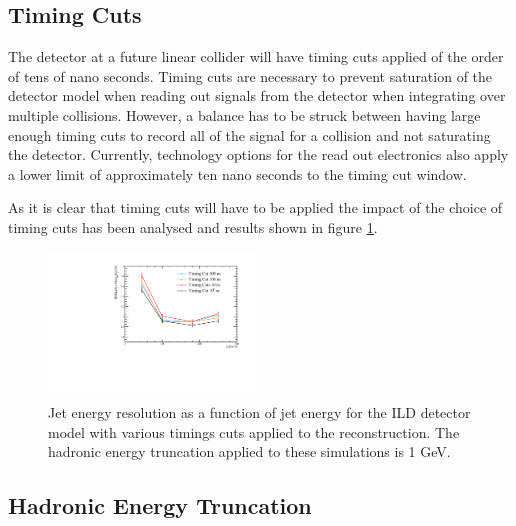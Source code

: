 \documentclass[final,3p,times,twocolumn]{elsarticle}
\begin{document}
\subsection{Timing Cuts}

The detector at a future linear collider will have timing cuts applied of the order of tens of nano seconds.  Timing cuts are necessary to prevent saturation of the detector model when reading out signals from the detector when integrating over multiple collisions.  However, a balance has to be struck between having large enough timing cuts to record all of the signal for a collision and not saturating the detector.  Currently, technology options for the read out electronics also apply a lower limit of approximately ten nano seconds to the timing cut window.

As it is clear that timing cuts will have to be applied the impact of the choice of timing cuts has been analysed and results shown in figure \ref{4-TC}.

\begin{figure}[!h]
  \begin{center}
     \includegraphics[width=0.49\textwidth]{4_BasicDetPerf/TimingCut.pdf}
     \caption{Jet energy resolution as a function of jet energy for the ILD detector model with various timings cuts applied to the reconstruction.  The hadronic energy truncation applied to these simulations is 1 GeV.  \label{4-TC}}
  \end{center}
\end{figure}

\subsection{Hadronic Energy Truncation}


\end{document}
